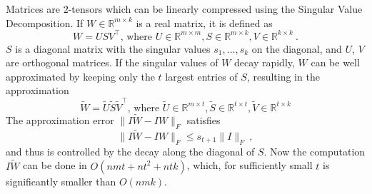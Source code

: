 Matrices are $2$-tensors which can be linearly compressed using the Singular Value Decomposition.
If $W \in \mathbb{R}^{m \times k}$ is a real matrix, it is defined as
%
\begin{equation*}
	W = USV^{\top}\text{, where }U \in \mathbb{R}^{m \times m}, S \in \mathbb{R}^{m \times k}, V \in \mathbb{R}^{k \times k}~.
\end{equation*}
$S$ is a diagonal matrix with the singular values $s_1, \dots, s_k$ on the diagonal, and $U$, $V$ are orthogonal matrices. 
If the singular values of $W$ decay rapidly, $W$ can be well approximated by keeping only the $t$ largest entries of $S$, 
resulting in the approximation 
\begin{equation}
\label{svdapprox}
	\tilde{W} = \tilde{U}\tilde{S}\tilde{V}^{\top}\text{, where }\tilde{U} \in \mathbb{R}^{m \times t}, \tilde{S} \in \mathbb{R}^{t \times t}, \tilde{V} \in \mathbb{R}^{t \times k}
\end{equation}
The approximation error $\| I \tilde{W} - I W \|_F$ satisfies 
\begin{equation}
\label{svdapproxerr}
\| I \tilde{W} - I W \|_F \leq s_{t+1} \| I \|_F~,
\end{equation}
and thus is controlled by the decay along the diagonal of $S$.
Now the computation $I\tilde{W}$ can be done in $O(nmt + nt^2 + ntk)$, which, for sufficiently small $t$ is significantly smaller than $O(nmk)$. 

